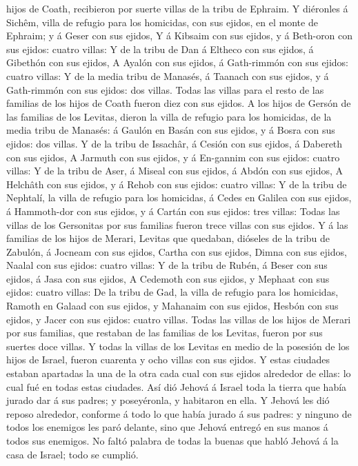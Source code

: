 hijos de Coath, recibieron por suerte villas de la tribu de Ephraim.
 Y diéronles á Sichêm, villa de refugio para los
homicidas, con sus ejidos, en el monte de Ephraim; y á Geser con sus
ejidos,  Y á Kibsaim con sus ejidos, y á Beth-oron con
sus ejidos: cuatro villas:  Y de la tribu de Dan á
Eltheco con sus ejidos, á Gibethón con sus ejidos,  A
Ayalón con sus ejidos, á Gath-rimmón con sus ejidos: cuatro villas:
 Y de la media tribu de Manasés, á Taanach con sus
ejidos, y á Gath-rimmón con sus ejidos: dos villas. 
Todas las villas para el resto de las familias de los hijos de Coath
fueron diez con sus ejidos.  A los hijos de Gersón de las
familias de los Levitas, dieron la villa de refugio para los homicidas,
de la media tribu de Manasés: á Gaulón en Basán con sus ejidos, y á
Bosra con sus ejidos: dos villas.  Y de la tribu de
Issachâr, á Cesión con sus ejidos, á Dabereth con sus ejidos,
 A Jarmuth con sus ejidos, y á En-gannim con sus ejidos:
cuatro villas:  Y de la tribu de Aser, á Miseal con sus
ejidos, á Abdón con sus ejidos,  A Helchâth con sus
ejidos, y á Rehob con sus ejidos: cuatro villas:  Y de la
tribu de Nephtalí, la villa de refugio para los homicidas, á Cedes en
Galilea con sus ejidos, á Hammoth-dor con sus ejidos, y á Cartán con sus
ejidos: tres villas:  Todas las villas de los Gersonitas
por sus familias fueron trece villas con sus ejidos.  Y á
las familias de los hijos de Merari, Levitas que quedaban, dióseles de
la tribu de Zabulón, á Jocneam con sus ejidos, Cartha con sus ejidos,
 Dimna con sus ejidos, Naalal con sus ejidos: cuatro
villas:  Y de la tribu de Rubén, á Beser con sus ejidos,
á Jasa con sus ejidos,  A Cedemoth con sus ejidos, y
Mephaat con sus ejidos: cuatro villas:  De la tribu de
Gad, la villa de refugio para los homicidas, Ramoth en Galaad con sus
ejidos, y Mahanaim con sus ejidos,  Hesbón con sus
ejidos, y Jacer con sus ejidos: cuatro villas.  Todas las
villas de los hijos de Merari por sus familias, que restaban de las
familias de los Levitas, fueron por sus suertes doce villas.
 Y todas la villas de los Levitas en medio de la posesión
de los hijos de Israel, fueron cuarenta y ocho villas con sus ejidos.
 Y estas ciudades estaban apartadas la una de la otra
cada cual con sus ejidos alrededor de ellas: lo cual fué en todas estas
ciudades.  Así dió Jehová á Israel toda la tierra que
había jurado dar á sus padres; y poseyéronla, y habitaron en ella.
 Y Jehová les dió reposo alrededor, conforme á todo lo
que había jurado á sus padres: y ninguno de todos los enemigos les paró
delante, sino que Jehová entregó en sus manos á todos sus enemigos.
 No faltó palabra de todas la buenas que habló Jehová á
la casa de Israel; todo se cumplió.


